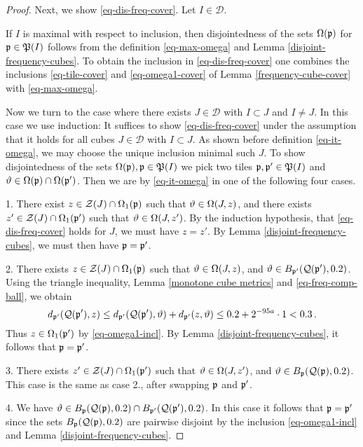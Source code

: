 {\begin{proof}
    Next, we show \eqref{eq-dis-freq-cover}. Let $I \in \mathcal{D}$.

    If $I$ is maximal with respect to inclusion, then disjointedness of the sets ${\Omega}({\mathfrak p})$ for ${\mathfrak p} \in {\mathfrak P}(I)$ follows from the definition \eqref{eq-max-omega} and Lemma \ref{disjoint-frequency-cubes}. To obtain the inclusion in \eqref{eq-dis-freq-cover} one combines the inclusions \eqref{eq-tile-cover} and \eqref{eq-omega1-cover}
    of Lemma \ref{frequency-cube-cover} with  \eqref{eq-max-omega}.

    Now we turn to the case where there exists $J \in \mathcal{D}$ with $I \subset J$ and $I\ne J$. In this case we use induction: It suffices to show \eqref{eq-dis-freq-cover} under the assumption that it holds for all cubes $J \in \mathcal{D}$ with $I \subset J$. As shown before definition \eqref{eq-it-omega}, we may choose the unique inclusion minimal such $J$. To show disjointedness of the sets ${\Omega}({\mathfrak p}), {\mathfrak p} \in {\mathfrak P}(I)$ we pick two tiles ${\mathfrak p}, {\mathfrak p}' \in {\mathfrak P}(I)$ and ${\vartheta} \in {\Omega}({\mathfrak p}) \cap {\Omega}({\mathfrak p}')$.
    Then we are by \eqref{eq-it-omega} in one of the following four cases.

    1. There exist $z \in \mathcal{Z}(J) \cap \Omega_1({\mathfrak p})$ such that ${\vartheta} \in \Omega(J, z)$, and there exists $z' \in \mathcal{Z}(J) \cap \Omega_1({\mathfrak p}')$ such that ${\vartheta} \in \Omega(J, z')$. By the induction hypothesis, that \eqref{eq-dis-freq-cover} holds for $J$, we must have $z = z'$. By Lemma \ref{disjoint-frequency-cubes}, we must then have ${\mathfrak p} = {\mathfrak p}'$.

    2. There exists $z \in \mathcal{Z}(J) \cap \Omega_1({\mathfrak p})$ such that ${\vartheta} \in \Omega(J,z)$, and ${\vartheta} \in B_{{\mathfrak p}'}({\mathcal{Q}}({\mathfrak p}'), 0.2)$.  Using the triangle inequality, Lemma \ref{monotone
    cube metrics} and \eqref{eq-freq-comp-ball}, we obtain
    $$
        d_{{\mathfrak p}'}({\mathcal{Q}}({\mathfrak p}'),z) \le d_{{\mathfrak p}'}({\mathcal{Q}}({\mathfrak p}'), {\vartheta}) + d_{{\mathfrak p}'}(z, {\vartheta}) \le 0.2 + 2^{-95a} \cdot 1 < 0.3\,.
    $$
    Thus $z \in \Omega_1({\mathfrak p}')$ by \eqref{eq-omega1-incl}. By Lemma \ref{disjoint-frequency-cubes}, it follows that ${\mathfrak p} = {\mathfrak p}'$.

    3. There exists $z' \in \mathcal{Z}(J) \cap \Omega_1({\mathfrak p}')$ such that ${\vartheta} \in \Omega(J,z')$, and ${\vartheta} \in B_{{\mathfrak p}}({\mathcal{Q}}({\mathfrak p}), 0.2)$. This case is the same as case 2., after swapping ${\mathfrak p}$ and ${\mathfrak p}'$.

    4. We have ${\vartheta} \in B_{{\mathfrak p}}({\mathcal{Q}}({\mathfrak p}), 0.2) \cap B_{{\mathfrak p}'}({\mathcal{Q}}({\mathfrak p}'), 0.2)$. In this case it follows that ${\mathfrak p} = {\mathfrak p}'$ since the sets $B_{{\mathfrak p}}({\mathcal{Q}}({\mathfrak p}), 0.2)$ are pairwise disjoint by the inclusion \eqref{eq-omega1-incl} and Lemma \ref{disjoint-frequency-cubes}.


\end{proof}}
